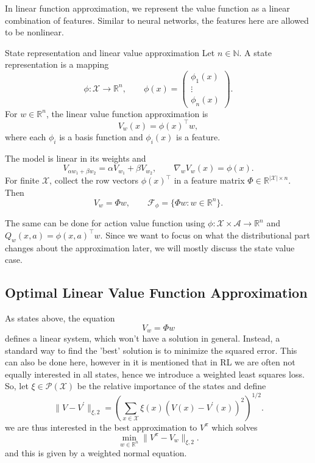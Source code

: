 \documentclass[12pt]{article}
\newcommand{\R}{\mathbb{R}}
\newcommand{\N}{\mathbb{N}}
\newcommand{\p}{\mathcal{P}}
\newcommand{\1}{\mathds{1}}
\newcommand{\X}{\mathcal{X}}
\newcommand{\A}{\mathcal{A}}
\newcommand{\F}{\mathcal{F}}
\newcommand{\norm}[1]{\lVert #1 \rVert}
\begin{document}
In linear function approximation, we represent the value function as a linear combination of features. Similar to neural networks, the features here are allowed to be nonlinear.

\begin{definition}{State representation and linear value approximation}{}
Let $n\in\N$. A state representation is a mapping
$$
  \phi:\X\to\R^n,
  \qquad
  \phi(x) =
  \begin{pmatrix}
    \phi_1(x) \\ \vdots \\ \phi_n(x)
  \end{pmatrix}.
$$
For $w\in\R^n$, the linear value function approximation is
$$
  V_w(x)=\phi(x)^\top w,
$$
where each $\phi_i$ is a basis function and $\phi_i(x)$ is a feature.
\end{definition}

The model is linear in its weights and
$$
  V_{\alpha w_1+\beta w_2}=\alpha V_{w_1}+\beta V_{w_2},
  \qquad \nabla_w V_w(x)=\phi(x).
$$
For finite $\X$, collect the row vectors $\phi(x)^\top$ in a feature matrix
$\Phi\in\R^{|\X|\times n}$. Then
$$
  V_w=\Phi w,
  \qquad
  \F_\phi=\{\Phi w:w\in\R^n\}.
$$

The same can be done for action value function using $\phi:\X\times\A\to\R^n$ and
$Q_w(x,a)=\phi(x,a)^\top w$. Since we want to focus on what the distributional part changes about the approximation later, we will mostly discuss the state value case. 

\subsection{Optimal Linear Value Function Approximation}

As states above, the equation $$V_w = \Phi w$$ defines a linear system, which won't have a solution in general. 
Instead, a standard way to find the 'best' solution is to minimize the squared error. This can also be done here, however in \cite{bellemare2023distributional} it is mentioned that in RL we are often not equally interested in all states, hence we introduce a weighted least squares loss. \\

So, let $\xi\in\p(\X)$ be the relative importance of the states and define
$$
  \norm{V-V^{\prime}}_{\xi,2}
  =\left(\sum_{x\in\X}\xi(x)(V(x)-V^{\prime}(x))^2\right)^{1/2}.
$$
we are thus interested in the best approximation to $V^\pi$ which solves
$$
  \min_{w\in\R^n}\norm{V^\pi-V_w}_{\xi,2}.
$$
and this is given by a weighted normal equation. 
\end{document}
